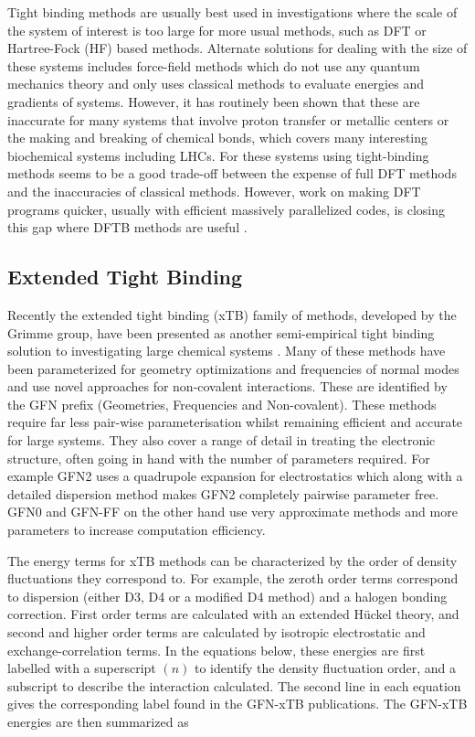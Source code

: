 Tight binding methods are usually best used in investigations where the scale of 
the  system of interest is too large for more usual methods, such as DFT or Hartree-Fock 
(HF) based methods. Alternate solutions for dealing with the size of these systems 
includes force-field methods which do not use any quantum mechanics theory and only
uses classical methods to evaluate energies and gradients of systems. However, it
has routinely been shown that these are inaccurate for many systems that involve 
proton transfer or metallic centers or the making and breaking of chemical bonds\cite{Salomon-Ferrer2013},
which covers many interesting biochemical systems including LHCs. For these systems
using tight-binding methods seems to be a good trade-off between the expense of 
full DFT methods and the inaccuracies of classical methods. However, work on making 
DFT programs quicker, usually with efficient massively parallelized codes, is closing 
this gap where DFTB methods are useful \cite{Manathunga2020}.

\subsection{Extended Tight Binding}
\label{subsec:xtb_methods}

Recently the extended tight binding (xTB) family of methods, developed by the Grimme 
group, have been presented as another semi-empirical tight binding solution to investigating 
large chemical systems \cite{Bannwarth2020, Bannwarth2019, Grimme2017, Pracht2019, Grimme2016, Spicher2020a}.
Many of these methods have been parameterized for geometry optimizations and frequencies 
of normal modes and use novel approaches for non-covalent interactions. These are
identified by the GFN prefix (Geometries, Frequencies and Non-covalent). These methods
require far less pair-wise parameterisation whilst remaining efficient and accurate
for large systems. They also cover a range of detail in treating the electronic
structure, often going in hand with the number of parameters required. For example
GFN2 uses a quadrupole expansion for electrostatics which along with a detailed 
dispersion method makes GFN2 completely pairwise parameter free. GFN0 and GFN-FF
on the other hand use very approximate methods and more parameters to increase computation
efficiency.

The energy terms for xTB methods can be characterized by the order of density fluctuations 
they correspond to. For example, the zeroth order terms correspond to dispersion 
(either D3\cite{Grimme2010}, D4\cite{Caldeweyher2020} or a modified D4 method) and
a halogen bonding correction. First order terms are calculated with an extended 
H\"{u}ckel theory, and second and higher order terms are calculated by isotropic
electrostatic and exchange-correlation terms. In the equations below, these energies
are first labelled with a superscript $\left(n\right)$ to identify the density fluctuation 
order, and a subscript to describe the interaction calculated. The second line in
each equation gives the corresponding label found in the GFN-xTB publications. The
GFN-xTB energies are then summarized as

